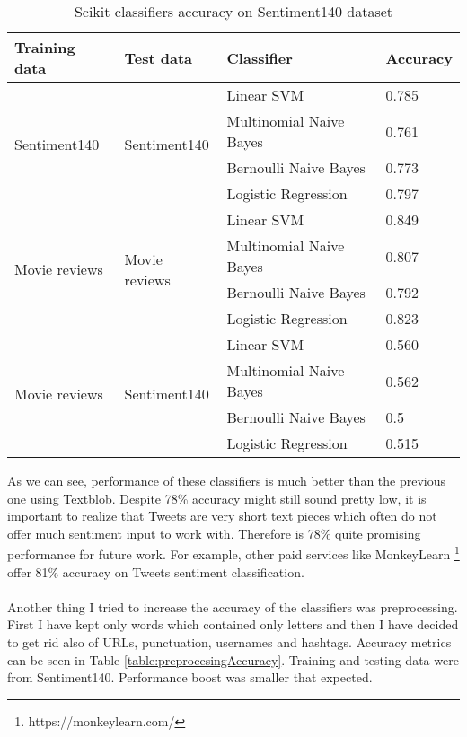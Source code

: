 \begin{table}[H]
\centering
\begin{tabular}{| p{2.5cm}|p{2.5cm}|p{4.5cm}|p{2cm}|}
 \hline
\textbf{ Training data }& \textbf{Test data} & \textbf{ Classifier }& \textbf{Accuracy}\\
 \hline
  \multirow{4}{*}{Sentiment140}   & \multirow{4}{*}{Sentiment140} & Linear SVM   & 0.785\\ 
    &  &  Multinomial Naive Bayes & 0.761\\ 
    &  &  Bernoulli Naive Bayes & 0.773\\  
    &  & Logistic Regression & 0.797\\ \hline 
  \multirow{4}{*}{Movie reviews}   & \multirow{4}{*}{Movie reviews} & Linear SVM   & 0.849\\ 
    &  &  Multinomial Naive Bayes & 0.807\\ 
    &  &  Bernoulli Naive Bayes & 0.792\\  
    &  & Logistic Regression & 0.823\\ \hline 
  \multirow{4}{*}{Movie reviews}   & \multirow{4}{*}{Sentiment140} & Linear SVM   & 0.560\\ 
    &  &  Multinomial Naive Bayes & 0.562\\ 
    &  &  Bernoulli Naive Bayes & 0.5\\  
    &  & Logistic Regression & 0.515\\ \hline 
\end{tabular}
\caption{Scikit classifiers accuracy on Sentiment140 dataset}
\label{table:scikitOnSentiment140}
\end{table}

As we can see, performance of these classifiers is much better than the previous one using Textblob. Despite 78\% accuracy might still sound pretty low, it is important to realize that Tweets are very short text pieces which often do not offer much sentiment input to work with. Therefore is 78\% quite promising performance for future work. For example, other paid services like MonkeyLearn \footnote{https://monkeylearn.com/} offer 81\% accuracy on Tweets sentiment classification.\\
\\
Another thing I tried to increase the accuracy of the classifiers was preprocessing. First I have kept only words which contained only letters and then I have decided to get rid also of URLs, punctuation, usernames and hashtags. Accuracy metrics can be seen in Table \ref{table:preprocesingAccuracy}. Training and testing data were from Sentiment140. Performance boost was smaller that expected.


